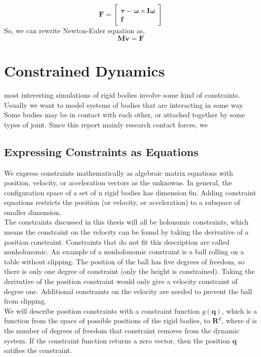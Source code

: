     \begin{equation}
        \mathbf{F} = \left[ \begin{array}{c} \pmb{\tau} - \pmb{\omega} \times \pmb{I} \pmb{\omega}\\ \pmb{f} \end{array}\right]
        \label{F}
    \end{equation}
    So, we can rewrite Newton-Euler equation as,
    \begin{equation}
        \pmb{M}\dot{\mathbf{v}} = \mathbf{F}
    \end{equation}


\section{Constrained Dynamics}
    most interesting simulations of rigid bodies involve some kind of constraints. Usually we want to model systems of bodies that are interacting in some way. Some bodies may be in contact with each other, or attached together by some types of joint. Since this report mainly research contact forces, we 
    \subsection{Expressing Constraints as Equations}
        We express constraints mathematically as algebraic matrix equations with position, velocity, or acceleration vectors as the unknowns. In general, the configuration space of a set of n rigid bodies has dimension 6n. Adding constraint equations restricts the position (or velocity, or acceleration) to a subspace of smaller dimension.\\

        The constraints discussed in this thesis will all be holonomic constraints, which means the constraint on the velocity can be found by taking the derivative of a position constraint. Constraints that do not fit this description are called nonholonomic. An example of a nonholonomic constraint is a ball rolling on a table without slipping. The position of the ball has five degrees of freedom, so there is only one degree of constraint (only the height is constrained). Taking the derivative of the position constraint would only give a velocity constraint of degree one. Additional constraints on the velocity are needed to prevent the ball from slipping.\\

        We will describe position constraints with a constraint function $g(\pmb{q})$, which is a function from the space of possible positions of the rigid bodies, to $\mathbf{R}^d$, where $d$ is the number of degrees of freedom that constraint removes from the dynamic system. If the constraint function returns a zero vector, then the position $\pmb{q}$ satifies the constraint. \\

